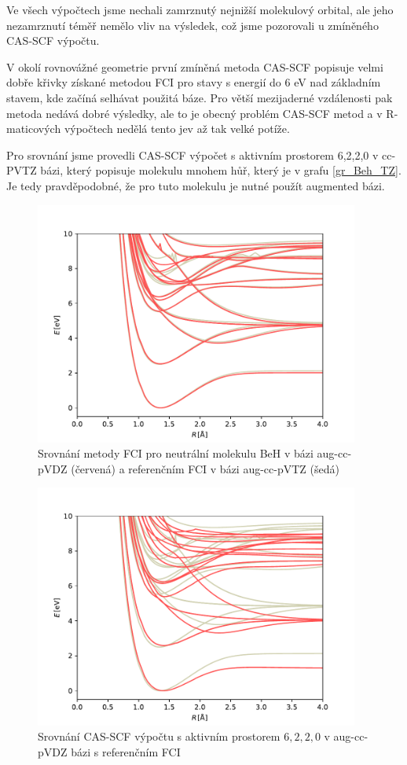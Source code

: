 Ve všech výpočtech jsme 
nechali zamrznutý nejnižší molekulový orbital, ale jeho nezamrznutí téměř nemělo vliv 
na výsledek, což jsme pozorovali u zmíněného CAS-SCF výpočtu.

V okolí rovnovážné geometrie první zmíněná metoda CAS-SCF popisuje velmi dobře křivky 
získané metodou FCI pro stavy s energií do 6 eV nad základním stavem, kde začíná 
selhávat použitá báze. Pro větší mezijaderné vzdálenosti pak metoda nedává dobré 
výsledky, ale to je obecný problém CAS-SCF metod a v R-maticových výpočtech nedělá 
tento jev až tak velké potíže.

Pro srovnání jsme provedli CAS-SCF výpočet s aktivním prostorem 6,2,2,0 v cc-PVTZ bázi, 
který popisuje molekulu mnohem hůř, který je v grafu \ref{gr_Beh_TZ}. Je tedy 
pravděpodobné, že pro tuto molekulu je nutné použít augmented bázi.
\begin{figure}
\centering
\includegraphics[width=0.95\textwidth]{../img/BeH-FCI-DZ.pdf}
\caption{Srovnání metody FCI pro neutrální molekulu BeH v bázi aug-cc-pVDZ (červená) a referenčním FCI v bázi aug-cc-pVTZ (šedá)}
\label{gr_Beh_FCI}
\end{figure}

\begin{figure}
\centering
\includegraphics[width=0.95\textwidth]{../img/BeH-MULTI-DZ-6220.pdf}
\caption{Srovnání CAS-SCF výpočtu s aktivním prostorem $6,2,2,0$ v aug-cc-pVDZ bázi s referenčním FCI}
\label{gr_Beh_6220}
\end{figure}

